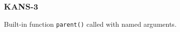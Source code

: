 \subsubsection{KANS-3}\label{sec:error_code_kans_3}

Built-in function \texttt{parent()} called with named arguments.


